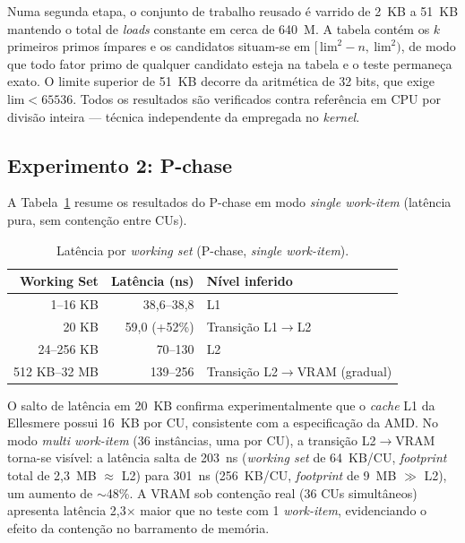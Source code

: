Numa segunda etapa, o conjunto de trabalho reusado é varrido de 2~KB a 51~KB mantendo o total de \textit{loads} constante em cerca de 640~M. A tabela contém os $k$ primeiros primos ímpares e os candidatos situam-se em $[\,\mathrm{lim}^2 - n,\ \mathrm{lim}^2)$, de modo que todo fator primo de qualquer candidato esteja na tabela e o teste permaneça exato. O limite superior de 51~KB decorre da aritmética de 32 bits, que exige $\mathrm{lim} < 65536$. Todos os resultados são verificados contra referência em CPU por divisão inteira --- técnica independente da empregada no \textit{kernel}.


\subsection{Experimento 2: P-chase}

A Tabela~\ref{tab:pchase} resume os resultados do P-chase em modo \textit{single work-item} (latência pura, sem contenção entre CUs).

\begin{table}[ht]
\centering
\caption{Latência por \textit{working set} (P-chase, \textit{single work-item}).}
\label{tab:pchase}
\small
\begin{tabular}{@{}rrl@{}}
\toprule
\textbf{Working Set} & \textbf{Latência (ns)} & \textbf{Nível inferido} \\
\midrule
1--16 KB & 38,6--38,8 & L1 \\
20 KB & 59,0 (+52\%) & Transição L1$\to$L2 \\
24--256 KB & 70--130 & L2 \\
512 KB--32 MB & 139--256 & Transição L2$\to$VRAM (gradual) \\
\bottomrule
\end{tabular}
\end{table}

O salto de latência em 20~KB confirma experimentalmente que o \textit{cache} L1 da Ellesmere possui 16~KB por CU, consistente com a especificação da AMD. No modo \textit{multi work-item} (36 instâncias, uma por CU), a transição L2$\to$VRAM torna-se visível: a latência salta de 203~ns (\textit{working set} de 64~KB/CU, \textit{footprint} total de 2,3~MB $\approx$ L2) para 301~ns (256~KB/CU, \textit{footprint} de 9~MB $\gg$ L2), um aumento de $\sim$48\%. A VRAM sob contenção real (36 CUs simultâneos) apresenta latência 2,3$\times$ maior que no teste com 1 \textit{work-item}, evidenciando o efeito da contenção no barramento de memória.

